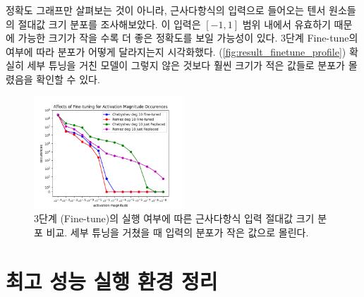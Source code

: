 \documentclass[a4paper, 11pt, chapterprefix=false]{report}
\begin{document}
정확도 그래프만 살펴보는 것이 아니라, 근사다항식의 입력으로 들어오는 텐서
원소들의 절대값 크기 분포를 조사해보았다. 이 입력은 $[-1, 1]$ 범위 내에서
유효하기 때문에 가능한 크기가 작을 수록 더 좋은 정확도를 보일 가능성이 있다.
3단계 Fine-tune의 여부에 따라 분포가 어떻게 달라지는지 시각화했다.
(\autoref{fig:result_finetune_profile}) 확실히 세부 튜닝을 거친 모델이 그렇지
않은 것보다 훨씬 크기가 적은 값들로 분포가 몰렸음을 확인할 수 있다.
\begin{figure}[htbp]
  \centering
  \includegraphics[width=0.5\textwidth]{resource/finetune_profile.png}
  \caption{3단계 (Fine-tune)의 실행 여부에 따른 근사다항식 입력 절대값 크기 분포 비교. 세부 튜닝을 거쳤을 때 입력의 분포가 작은 값으로 몰린다.}
  \label{fig:result_finetune_profile}
\end{figure}

\newpage
\section{최고 성능 실행 환경 정리}
\end{document}
